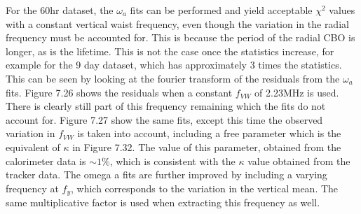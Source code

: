 For the 60hr dataset, the $\omega_{a}$ fits can be performed and yield acceptable $\chi^2$ values with a constant vertical waist frequency, even though the variation in the radial frequency must be accounted for. This is because the period of the radial CBO is longer, as is the lifetime. This is not the case once the statistics increase, for example for the 9 day dataset, which has approximately 3 times the statistics. This can be seen by looking at the fourier transform of the residuals from the $\omega_{a}$ fits. Figure 7.26 shows the residuals when a constant $f_{VW}$ of 2.23MHz  is used. There is clearly still part of this frequency remaining which the fits do not account for. Figure 7.27 show the same fits, except this time the observed variation in $f_{VW}$ is taken into account, including a free parameter which is the equivalent of $\kappa$ in Figure 7.32. The value of this parameter, obtained from the calorimeter data is $\sim{1}\%$, which is consistent with the $\kappa$ value obtained from the tracker data. The omega a fits are further improved by including a varying frequency at $f_{y}$, which corresponds to the variation in the vertical mean. The same multiplicative factor is used when extracting this frequency as well.     






